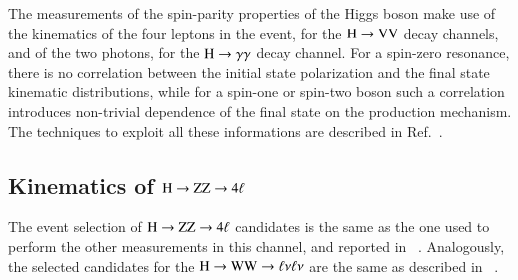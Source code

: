 The measurements of the spin-parity properties of the Higgs boson make
use of the kinematics of the four leptons in the event, for the
$\mathrm{H}\to\mathrm{V}\mathrm{V}$ decay channels, and of the two photons, for the
$\mathrm{H}\to\gamma\gamma$ decay channel.  For a spin-zero resonance, there is no
correlation between the initial state polarization and the final state
kinematic distributions, while for a spin-one or spin-two boson such a
correlation introduces non-trivial dependence of the final state on
the production mechanism.  The techniques to exploit all these
informations are described in Ref.~\cite{CMS:2014gga}.


\subsection{Kinematics of $\mathrm{H}\to\mathrm{Z}\mathrm{Z}\to4\ell$}
\label{sec:hzzkinematics}
The event selection of $\mathrm{H}\to\mathrm{Z}\mathrm{Z}\to4\ell$ candidates is the same as the one
used to perform the other measurements in this channel, and reported
in ~\cite{Chatrchyan:2013mxa}. Analogously, the selected candidates
for the $\mathrm{H}\to\mathrm{W}\mathrm{W}\to\ell\nu\ell\nu$ are the same as described in
~\cite{Chatrchyan:2013iaa}. 


